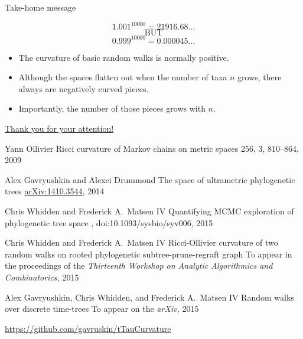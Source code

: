 \documentclass{beamer}
\theoremstyle{example}
\begin{document}
\begin{frame}{Take-home message}
\begin{block}{}
\[
1.001^{10000} = 21916.68\ldots
\]
\[
\mbox{BUT}
\]
\[
0.999^{10000} = 0.000045\ldots
\]
\end{block}

\pause

\begin{block}{}
\begin{itemize}
\item The curvature of basic random walks is normally positive.
\item Although the spaces flatten out when the number of taxa $n$ grows, there always are negatively curved pieces.
\item Importantly, the number of those pieces grows with $n$.
\end{itemize}
\end{block}
\end{frame}

\begin{frame}{\href{http://alex.gavruskin.com/pictures/}{\Large{Thank
you for your attention!}}}


\scriptsize

Yann Ollivier
\newblock Ricci curvature of Markov chains on metric spaces
 256, 3, 810--864, 2009

Alex Gavryushkin and Alexei Drummond
\newblock The space of ultrametric phylogenetic trees
 \href{http://arxiv.org/abs/1410.3544}{arXiv:1410.3544}, 2014

Chris Whidden and Frederick A.\ Matsen IV
\newblock Quantifying MCMC exploration of phylogenetic tree space
, doi:10.1093/sysbio/syv006, 2015

Chris Whidden and Frederick A.\ Matsen IV
\newblock Ricci-Ollivier curvature of two random walks on rooted phylogenetic subtree-prune-regraft graph
\newblock To appear in the proceedings of the {\em Thirteenth Workshop on Analytic Algorithmics and Combinatorics,} 2015

Alex Gavryushkin, Chris Whidden, and Frederick A.\ Matsen IV
\newblock Random walks over discrete time-trees
\newblock To appear on the {\em arXiv,} 2015

\url{https://github.com/gavruskin/tTauCurvature}
\end{frame}
\end{document}
